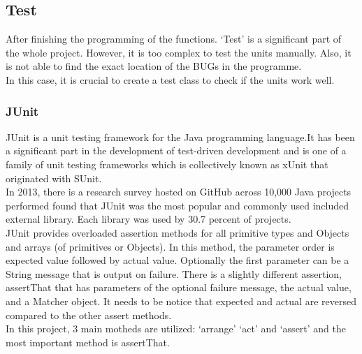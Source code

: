 \documentclass[a4paper,12pt]{article}
\begin{document}
\subsection{Test}
After finishing the programming of the functions. ‘Test’ is a significant part of the whole project. However, it is too complex to test the units manually. Also, it is not able to find the exact location of the BUGs in the programme.\\
In this case, it is crucial to create a test class to check if the units work well.\\
\subsubsection{JUnit}
JUnit is a unit testing framework for the Java programming language.It has been a significant part in the development of test-driven development and is one of a family of unit testing frameworks which is collectively known as xUnit that originated with SUnit.\\
In 2013, there is a research survey hosted on GitHub across 10,000 Java projects performed found that JUnit was the most popular and commonly used  included external library. Each library was used by 30.7 percent of projects.\\
JUnit provides overloaded assertion methods for all primitive types and Objects and arrays (of primitives or Objects). In this method, the parameter order is expected value followed by actual value. Optionally the first parameter can be a String message that is output on failure. There is a slightly different assertion, assertThat that has parameters of the optional failure message, the actual value, and a Matcher object. It needs to be notice that expected and actual are reversed compared to the other assert methods.\\
In this project, 3 main motheds are utilized: ‘arrange’ ‘act’ and ‘assert’ and the most important method is assertThat.\\
\end{document}
